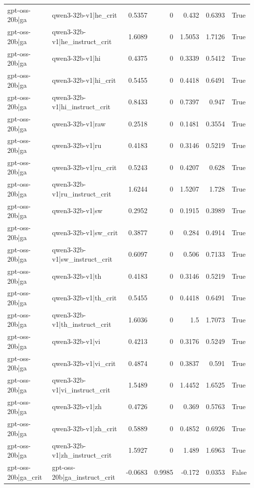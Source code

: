 \begin{table}
\begin{tabular}{l l r r r r l}
gpt-oss-20b|ga & qwen3-32b-v1|he_crit & 0.5357 & 0 & 0.432 & 0.6393 & True \\
gpt-oss-20b|ga & qwen3-32b-v1|he_instruct_crit & 1.6089 & 0 & 1.5053 & 1.7126 & True \\
gpt-oss-20b|ga & qwen3-32b-v1|hi & 0.4375 & 0 & 0.3339 & 0.5412 & True \\
gpt-oss-20b|ga & qwen3-32b-v1|hi_crit & 0.5455 & 0 & 0.4418 & 0.6491 & True \\
gpt-oss-20b|ga & qwen3-32b-v1|hi_instruct_crit & 0.8433 & 0 & 0.7397 & 0.947 & True \\
gpt-oss-20b|ga & qwen3-32b-v1|raw & 0.2518 & 0 & 0.1481 & 0.3554 & True \\
gpt-oss-20b|ga & qwen3-32b-v1|ru & 0.4183 & 0 & 0.3146 & 0.5219 & True \\
gpt-oss-20b|ga & qwen3-32b-v1|ru_crit & 0.5243 & 0 & 0.4207 & 0.628 & True \\
gpt-oss-20b|ga & qwen3-32b-v1|ru_instruct_crit & 1.6244 & 0 & 1.5207 & 1.728 & True \\
gpt-oss-20b|ga & qwen3-32b-v1|sw & 0.2952 & 0 & 0.1915 & 0.3989 & True \\
gpt-oss-20b|ga & qwen3-32b-v1|sw_crit & 0.3877 & 0 & 0.284 & 0.4914 & True \\
gpt-oss-20b|ga & qwen3-32b-v1|sw_instruct_crit & 0.6097 & 0 & 0.506 & 0.7133 & True \\
gpt-oss-20b|ga & qwen3-32b-v1|th & 0.4183 & 0 & 0.3146 & 0.5219 & True \\
gpt-oss-20b|ga & qwen3-32b-v1|th_crit & 0.5455 & 0 & 0.4418 & 0.6491 & True \\
gpt-oss-20b|ga & qwen3-32b-v1|th_instruct_crit & 1.6036 & 0 & 1.5 & 1.7073 & True \\
gpt-oss-20b|ga & qwen3-32b-v1|vi & 0.4213 & 0 & 0.3176 & 0.5249 & True \\
gpt-oss-20b|ga & qwen3-32b-v1|vi_crit & 0.4874 & 0 & 0.3837 & 0.591 & True \\
gpt-oss-20b|ga & qwen3-32b-v1|vi_instruct_crit & 1.5489 & 0 & 1.4452 & 1.6525 & True \\
gpt-oss-20b|ga & qwen3-32b-v1|zh & 0.4726 & 0 & 0.369 & 0.5763 & True \\
gpt-oss-20b|ga & qwen3-32b-v1|zh_crit & 0.5889 & 0 & 0.4852 & 0.6926 & True \\
gpt-oss-20b|ga & qwen3-32b-v1|zh_instruct_crit & 1.5927 & 0 & 1.489 & 1.6963 & True \\
gpt-oss-20b|ga_crit & gpt-oss-20b|ga_instruct_crit & -0.0683 & 0.9985 & -0.172 & 0.0353 & False \\

\end{tabular}
\end{table}
